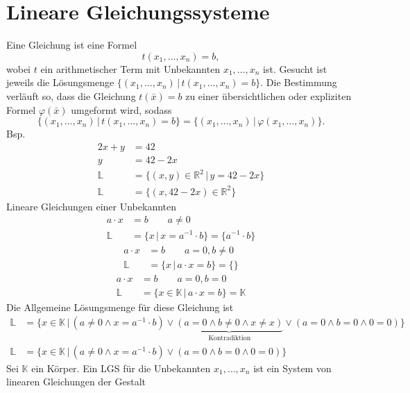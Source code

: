 \documentclass[a4paper,12pt]{article}
\numberwithin{equation}{section}
\begin{document}
\section{Lineare Gleichungssysteme}
Eine Gleichung ist eine Formel
\[ 
        t\left(x_1,\hdots,x_n\right)=b
,\] 
wobei $t$ ein arithmetischer Term mit Unbekannten $x_1,\hdots,x_n$ ist. Gesucht ist jeweils die Lösungsmenge $\{\left(x_1,\hdots,x_n\right)\,|\, t\left(x_1,\hdots,x_n\right)=b\}$. Die Bestimmung verläuft so, dass die Gleichung $t\left(\bar{x}\right)=b$ zu einer übersichtlichen oder expliziten Formel $\varphi \left(\bar{x}\right)$ umgeformt wird, sodass
\[ 
        \{\left(x_1,\hdots,x_n\right)\,|\, t\left(x_1,\hdots,x_n\right)=b\}=\{\left(x_1,\hdots,x_n\right)\,|\, \varphi \left(x_1,\hdots,x_n\right)\}
.\] 
Bsp.
\begin{align*}
        2x+y&=42\\
        y&=42-2x\\
        \mathbb{L}&=\{\left(x,y\right) \in \mathbb{R}^2\,|\, y=42-2x\}\\
        \mathbb{L}&=\{\left(x,42-2x\right) \in \mathbb{R}^2\}
\end{align*}
Lineare Gleichungen einer Unbekannten
\begin{align*}
        a\cdot x&=b\qquad a\neq 0\\
        \mathbb{L}&=\{x\,|\, x=a^{-1}\cdot b\}=\{a^{-1}\cdot b\}
\end{align*}
\begin{align*}
        a\cdot x&=b\qquad a=0,b\neq 0\\
        \mathbb{L}&=\{x\,|\, a\cdot x=b\}=\{\}
\end{align*}
\begin{align*}
        a\cdot x&=b\qquad a=0,b=0\\
        \mathbb{L}&=\{x \in \mathbb{K}\,|\, a\cdot x=b\}=\mathbb{K}
\end{align*}
Die Allgemeine Lösungsmenge für diese Gleichung ist
\begin{align*}
        \mathbb{L}&=\{x \in \mathbb{K}\,|\, \left(a\neq 0\land x=a^{-1}\cdot b\right)\lor \underbrace{\left(a=0\land b\neq 0\land x\neq x\right)}_{\text{Kontradiktion}}\lor \left(a=0\land b=0\land 0=0\right)\}\\
        \mathbb{L}&=\{x \in \mathbb{K}\,|\, \left(a\neq 0\land x=a^{-1}\cdot b\right)\lor \left(a=0\land b=0\land 0=0\right)\}
\end{align*}
Sei $\mathbb{K}$ ein Körper. Ein LGS für die Unbekannten $x_1,\hdots,x_n$ ist ein System von linearen Gleichungen der Gestalt
\end{document}
